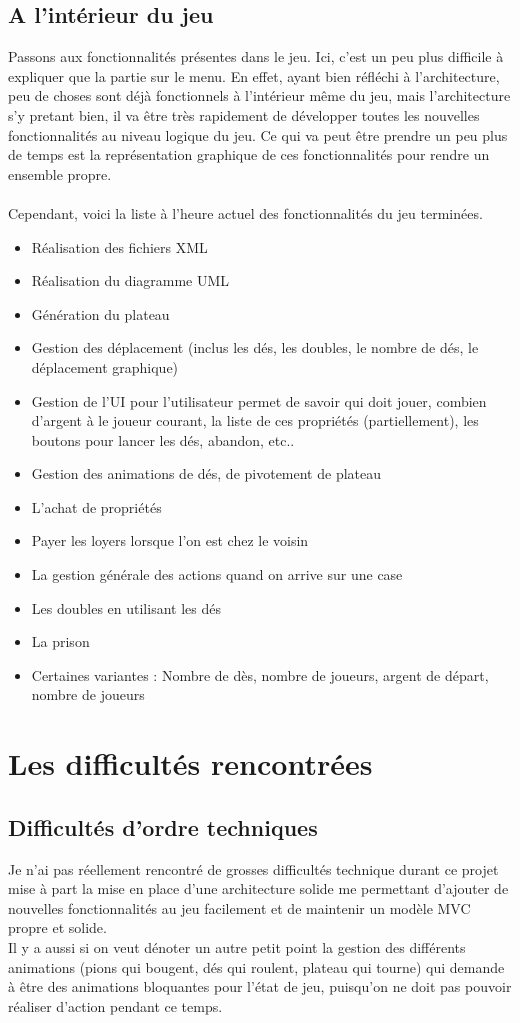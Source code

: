 \documentclass[12pt, openany]{report}
\begin{document}
    \section{A l'intérieur du jeu}
    Passons aux fonctionnalités présentes dans le jeu. Ici, c'est un peu plus difficile à expliquer que la partie sur le menu. En effet, ayant bien réfléchi à l'architecture, peu de choses sont déjà fonctionnels à l'intérieur même du jeu, mais l'architecture s'y pretant bien, il va être très rapidement de développer toutes les nouvelles fonctionnalités au niveau logique du jeu. Ce qui va peut être prendre un peu plus de temps est la représentation graphique de ces fonctionnalités pour rendre un ensemble propre.\\\\
    Cependant, voici la liste à l'heure actuel des fonctionnalités du jeu terminées.
    \begin{itemize}
      \item Réalisation des fichiers XML
      \item Réalisation du diagramme UML
      \item Génération du plateau
      \item Gestion des déplacement (inclus les dés, les doubles, le nombre de dés, le déplacement graphique)
      \item Gestion de l'UI pour l'utilisateur permet de savoir qui doit jouer, combien d'argent à le joueur courant, la liste de ces propriétés (partiellement), les boutons pour lancer les dés, abandon, etc..
      \item Gestion des animations de dés, de pivotement de plateau
      \item L'achat de propriétés
      \item Payer les loyers lorsque l'on est chez le voisin
      \item La gestion générale des actions quand on arrive sur une case
      \item Les doubles en utilisant les dés
      \item La prison 
      \item Certaines variantes : Nombre de dès, nombre de joueurs, argent de départ, nombre de joueurs
    \end{itemize}

  \chapter{Les difficultés rencontrées}
    \section{Difficultés d'ordre techniques}
      Je n'ai pas réellement rencontré de grosses difficultés technique durant ce projet mise à part la mise en place d'une architecture solide me permettant d'ajouter de nouvelles fonctionnalités au jeu facilement et de maintenir un modèle MVC propre et solide.\\
      Il y a aussi si on veut dénoter un autre petit point la gestion des différents animations (pions qui bougent, dés qui roulent, plateau qui tourne) qui demande à être des animations bloquantes pour l'état de jeu, puisqu'on ne doit pas pouvoir réaliser d'action pendant ce temps.
\end{document}
